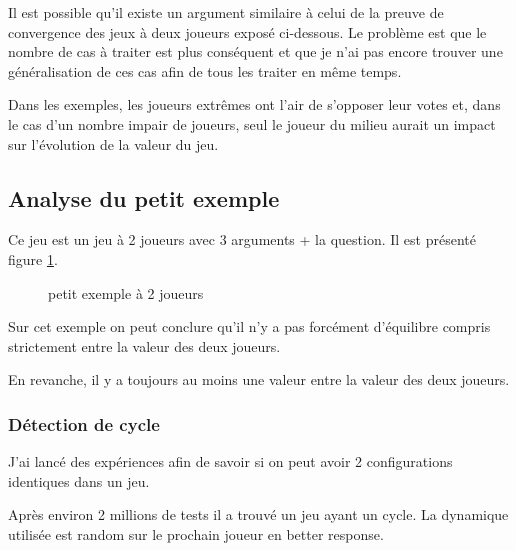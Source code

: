 \documentclass[12pt]{article}
\theoremstyle{defi}
\theoremstyle{not}
\theoremstyle{prob}
\begin{document}
      Il est possible qu'il existe un argument similaire à celui de la preuve de convergence des jeux à deux joueurs exposé ci-dessous.
      Le problème est que le nombre de cas à traiter est plus conséquent et que je n'ai pas encore trouver une généralisation de ces cas afin de tous les traiter en même temps.

      Dans les exemples, les joueurs extrêmes ont l'air de s'opposer leur votes et, dans le cas d'un nombre impair de joueurs, seul le joueur du milieu aurait un impact sur l'évolution de la valeur du jeu.

\color{blue}
    \subsection{Analyse du petit exemple}
      Ce jeu est un jeu à 2 joueurs avec 3 arguments + la question.
      Il est présenté figure \ref{fig:petit_ex}.

      \begin{figure}
        \centering
        \caption{petit exemple à 2 joueurs}
        \label{fig:petit_ex}
      \end{figure}

      Sur cet exemple on peut conclure qu'il n'y a pas forcément d'équilibre compris strictement entre la valeur des deux joueurs.

      En revanche, il y a toujours au moins une valeur entre la valeur des deux joueurs.


      \subsubsection{Détection de cycle}
        J'ai lancé des expériences afin de savoir si on peut avoir 2 configurations identiques dans un jeu.

        Après environ 2 millions de tests il a trouvé un jeu ayant un cycle. La dynamique utilisée est random sur le prochain joueur en better response.
\end{document}
